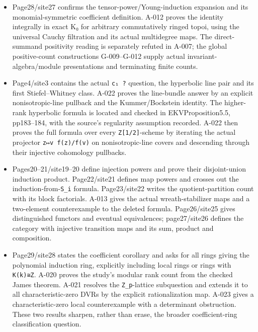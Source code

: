 \documentclass[
  10pt,
]{article}
\begin{document}
\begin{itemize}
  has one element.
\item
  Page28/site27 confirms the tensor-power/Young-induction expansion and
  its monomial-symmetric coefficient definition. A-012 proves the
  identity integrally in exact K₀ for arbitrary commutatively ringed
  topoi, using the universal Cauchy filtration and its actual
  multidegree maps. The direct-summand positivity reading is separately
  refuted in A-007; the global positive-count constructions G-009--G-012
  supply actual invariant-algebra/module presentations and terminating
  finite counts.
\item
  Page4/site3 contains the actual \texttt{\small c₁ ?} question, the
  hyperbolic line pair and its first Stiefel--Whitney class. A-022
  proves the line-bundle answer by an explicit nonisotropic-line
  pullback and the Kummer/Bockstein identity. The higher-rank hyperbolic
  formula is located and checked in EKVProposition5.5, pp183--184, with
  the source's regularity assumption recorded. A-022 then proves the
  full formula over every
  \texttt{\small Z[\allowbreak{}1/\allowbreak{}2]\allowbreak{}}-scheme
  by iterating the actual projector
  \texttt{\small z↦v f(\allowbreak{}z)\allowbreak{}/\allowbreak{}f(\allowbreak{}v)\allowbreak{}}
  on nonisotropic-line covers and descending through their injective
  cohomology pullbacks.
\item
  Pages20--21/site19--20 define injection powers and prove their
  disjoint-union induction product. Page22/site21 defines map powers and
  crosses out the induction-from-\texttt{\small S\_\allowbreak{}i}
  formula. Page23/site22 writes the quotient-partition count with its
  block factorials. A-013 gives the actual wreath-stabilizer maps and a
  two-element counterexample to the deleted formula. Page26/site25 gives
  distinguished functors and eventual equivalences; page27/site26
  defines the category with injective transition maps and its sum,
  product and composition.
\item
  Page29/site28 states the coefficient corollary and asks for all rings
  giving the polynomial induction ring, explicitly including local rings
  or rings with \texttt{\small K(\allowbreak{}k)\allowbreak{}≅Z}. A-020
  proves the study's modular rank count from the checked James theorem.
  A-021 resolves the \texttt{\small Z\_\allowbreak{}p}-lattice
  subquestion and extends it to all characteristic-zero DVRs by the
  explicit rationalization map. A-023 gives a characteristic-zero local
  counterexample with a determinant obstruction. These two results
  sharpen, rather than erase, the broader coefficient-ring
  classification question.
\end{itemize}
\end{document}
